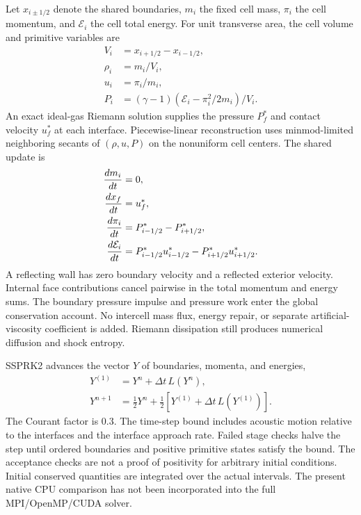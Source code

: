 \documentclass[twocolumn]{aastex63}
\begin{document}
Let $x_{i\pm1/2}$ denote the shared boundaries, $m_i$ the fixed cell mass,
$\pi_i$ the cell momentum, and $\mathcal E_i$ the cell total energy.
For unit transverse area, the cell volume and primitive variables are
\begin{align}
 V_i&=x_{i+1/2}-x_{i-1/2},\\
 \rho_i&=m_i/V_i,\\
 u_i&=\pi_i/m_i,\\
 P_i&=(\gamma-1)(\mathcal E_i-\pi_i^2/2m_i)/V_i.
\end{align}
An exact ideal-gas Riemann solution supplies the pressure $P_f^*$ and
contact velocity $u_f^*$ at each interface. Piecewise-linear reconstruction
\citep{vanLeer1979} uses minmod-limited neighboring secants of
$(\rho,u,P)$ on the nonuniform cell centers. The shared update is
\begin{align}
 {d m_i\over dt}&=0,\\
 {d x_f\over dt}&=u_f^*,\\
 {d\pi_i\over dt}&=P_{i-1/2}^*-P_{i+1/2}^*,\\
 {d\mathcal E_i\over dt}
 &=P_{i-1/2}^*u_{i-1/2}^*-P_{i+1/2}^*u_{i+1/2}^*.
 \label{eq:material1d_update}
\end{align}
A reflecting wall has zero boundary velocity and a reflected exterior
velocity. Internal face contributions cancel pairwise in the total momentum
and energy sums. The boundary pressure impulse and pressure work enter the
global conservation account. No intercell mass flux, energy repair, or
separate artificial-viscosity coefficient is added. Riemann dissipation
still produces numerical diffusion and shock entropy.

SSPRK2 advances the vector $Y$ of boundaries, momenta, and energies,
\begin{align}
 Y^{(1)}&=Y^n+\Delta t\,L(Y^n),\\
 Y^{n+1}&=\tfrac12Y^n+\tfrac12[Y^{(1)}+\Delta t\,L(Y^{(1)})].
\end{align}
The Courant factor is 0.3. The time-step bound includes acoustic motion
relative to the interfaces and the interface approach rate. Failed stage
checks halve the step until ordered boundaries and positive primitive
states satisfy the bound. The acceptance checks are not a proof of
positivity for arbitrary initial conditions. Initial conserved quantities
are integrated over the actual intervals. The present native CPU comparison
has not been incorporated into the full MPI/OpenMP/CUDA solver.
\end{document}
